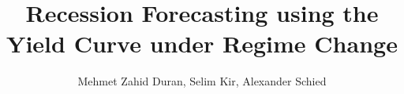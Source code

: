 
\newcommand{\mytopic}{48E SP.TP.IN FINAN.ECON.&MACHINE LEARN.}
\newcommand{\mytitle}{Recession Forecasting using the Yield Curve under Regime Change}
\title{\mytitle}

\newcommand{\myname}{Mehmet Zahid Duran, Selim Kir, Alexander Schied}
\author{\myname}

\newcommand{\note}[1]{%
  \textbf{\textcolor{orange}{\large [TODO: #1]}} %
}

\usepackage[a4paper, width=160mm, top=35mm, bottom=30mm, bindingoffset=0mm]{geometry}
\usepackage[T1]{fontenc}          
\usepackage[utf8]{inputenc}       
\usepackage[english]{babel}
\usepackage{csquotes}             
\usepackage{lmodern,textcomp}
\usepackage{microtype}

\usepackage{etoolbox}
\usepackage[scaled=0.92]{helvet} %


\usepackage{graphicx}
\usepackage{xcolor}
\usepackage{float}

\usepackage{threeparttable}
\usepackage{longtable}
\usepackage[justification=centering]{caption}
\usepackage{booktabs}
\usepackage{array}
\usepackage{booktabs, adjustbox, rotating}

\usepackage{amsmath}
\usepackage{amsfonts}
\usepackage{amsthm}
\newtheorem{theorem}{Theorem}
\newtheorem{lemma}{Lemma}
\newtheorem{remark}{Note}
\newtheorem{proposition}{Proposition}
\renewcommand{\qedsymbol}{qed.}
\makeatletter
\renewenvironment{proof}[1][\proofname]{\par
  \pushQED{\qed}%
  \normalfont \topsep6\p@\@plus6\p@\relax
  \trivlist
  \item[\hskip\labelsep \bfseries #1\@addpunct{.}]\ignorespaces
}{%
  \popQED\endtrivlist\@endpefalse
}
\makeatother
\usepackage{dsfont}

\usepackage{pgfplots}
\usepackage{pgfplotstable}
\pgfplotsset{compat=newest}
\usetikzlibrary{positioning, arrows.meta}

